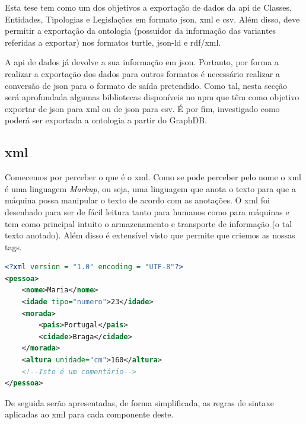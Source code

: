 Esta tese tem como um dos objetivos a exportação de dados da \acrshort{api} de Classes, Entidades, Tipologias e Legislações em formato \acrshort{json}, \acrshort{xml} e \acrshort{csv}. Além disso, deve permitir a exportação da ontologia (possuidor da informação das variantes referidas a exportar) nos formatos \acrshort{turtle}, \acrshort{json-ld} e \acrshort{rdf}/\acrshort{xml}.

A \acrshort{api} de dados já devolve a sua informação em \acrshort{json}. Portanto, por forma a realizar a exportação dos dados para outros formatos é necessário realizar a conversão de \acrshort{json} para o formato de saída pretendido. Como tal, nesta secção será aprofundada algumas bibliotecas disponíveis no \acrshort{npm} que têm como objetivo exportar de \acrshort{json} para \acrshort{xml} ou de \acrshort{json} para \acrshort{csv}. É por fim, investigado como poderá ser exportada a ontologia a partir do GraphDB.

\subsection{\acrshort{xml}}

Comecemos por perceber o que é o \acrfull{xml}. Como se pode perceber pelo nome o \acrshort{xml} é uma linguagem \textit{Markup}, ou seja, uma linguagem que anota o texto para que a máquina possa manipular o texto de acordo com as anotações. O \acrshort{xml} foi desenhado para ser de fácil leitura tanto para humanos como para máquinas e tem como principal intuito o armazenamento e transporte de informação (o tal texto anotado). Além disso é extensível visto que permite que criemos as nossas tags.

\begin{lstlisting}[language=xml, caption=Pequeno exemplo em \acrshort{xml}, label=exem:xmlEx]
<?xml version = "1.0" encoding = "UTF-8"?>
<pessoa>
    <nome>Maria</nome>
    <idade tipo="numero">23</idade>
    <morada>
        <pais>Portugal</pais>
        <cidade>Braga</cidade>
    </morada>
    <altura unidade="cm">160</altura>
    <!--Isto é um comentário-->
</pessoa>
\end{lstlisting}

De seguida serão apresentadas, de forma simplificada, as regras de sintaxe aplicadas ao \acrshort{xml} para cada componente deste.

